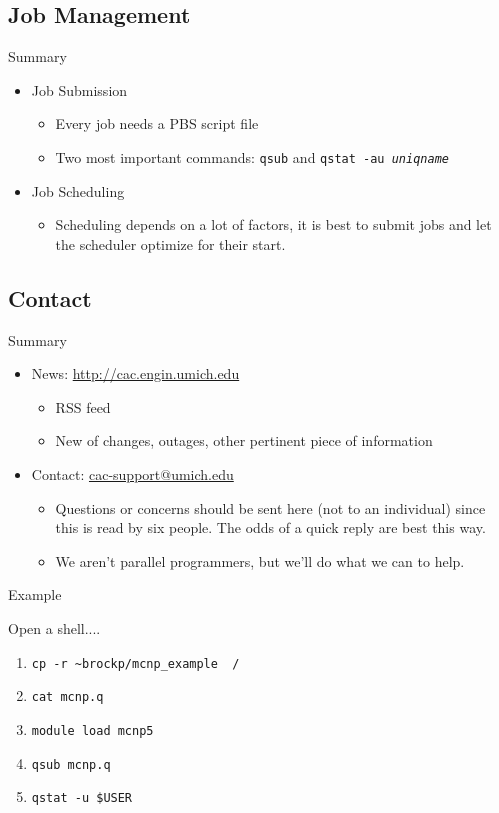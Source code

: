 \documentclass{beamer}
\begin{document}
\subsection{Job Management}
\begin{frame}{Summary}
 \begin{itemize}
   \item Job Submission
     \begin{itemize}
     \item Every job needs a PBS script file
     \item Two most important commands: \texttt{qsub} and \texttt{qstat -au \textit{uniqname}}
     \end{itemize}
   \item Job Scheduling
     \begin{itemize}
     \item Scheduling depends on a lot of factors, it is best to submit jobs and let the
scheduler optimize for their start.
     \end{itemize}
 \end{itemize}
\end{frame}
\subsection{Contact}
\begin{frame}{Summary}
 \begin{itemize}
 \item News: \url{http://cac.engin.umich.edu}
   \begin{itemize}
    \item RSS feed
    \item New of changes, outages, other pertinent piece of information
   \end{itemize}
  \item Contact: \url{cac-support@umich.edu}
   \begin{itemize}
    \item Questions or concerns should be sent here (not to an individual) since
this is read by six people.  The odds of a quick reply are best this way.
    \item We aren't parallel programmers, but we'll do what we can to help.
   \end{itemize}
 \end{itemize}
\end{frame}
\begin{frame}{Example}
 \begin{example}
  Open a shell....
  \begin{enumerate}
   \item<1>  \texttt{cp -r \textasciitilde brockp/mcnp\_example ~/}
   \item<2>  \texttt{cat mcnp.q}
   \item<3>  \texttt{module load mcnp5}
   \item<4>  \texttt{qsub mcnp.q}
   \item<5>  \texttt{qstat -u \$USER}
  \end{enumerate}
 \end{example}
\end{frame}
\end{document}
